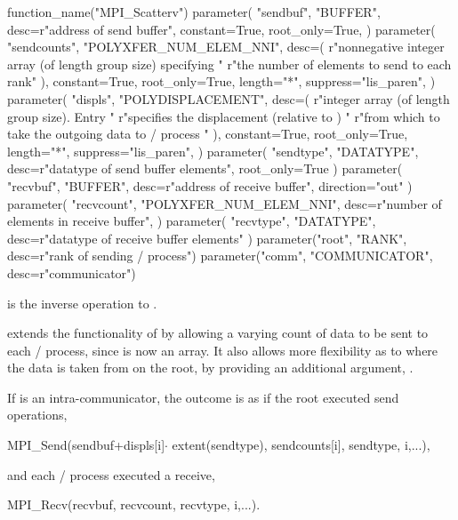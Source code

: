 \begin{mpi-binding}
    function_name("MPI_Scatterv")
    parameter(
        "sendbuf",
        "BUFFER",
        desc=r"address of send buffer",
        constant=True,
        root_only=True,
    )
    parameter(
        "sendcounts",
        "POLYXFER_NUM_ELEM_NNI",
        desc=(
            r"nonnegative integer array (of length group size) specifying "
            r"the number of elements to send to each rank"
        ),
        constant=True,
        root_only=True,
        length="*",
        suppress="lis_paren",
    )
    parameter(
        "displs",
        "POLYDISPLACEMENT",
        desc=(
            r"integer array (of length group size). Entry  "
            r"specifies the displacement (relative to ) "
            r"from which to take the outgoing data to \MPI/ process "
        ),
        constant=True,
        root_only=True,
        length="*",
        suppress="lis_paren",
    )
    parameter(
        "sendtype",
        "DATATYPE",
        desc=r"datatype of send buffer elements",
        root_only=True
    )
    parameter(
        "recvbuf", "BUFFER", desc=r"address of receive buffer", direction="out"
    )
    parameter(
        "recvcount",
        "POLYXFER_NUM_ELEM_NNI",
        desc=r"number of elements in receive buffer",
    )
    parameter(
        "recvtype", "DATATYPE", desc=r"datatype of receive buffer elements"
    )
    parameter("root", "RANK", desc=r"rank of sending \MPI/ process")
    parameter("comm", "COMMUNICATOR", desc=r"communicator")
\end{mpi-binding}

 is the inverse operation to .

 extends the functionality of 
by allowing a varying count of data to be sent to each \MPI/ process,
since  is now an array.
It also allows more flexibility as to where the data
is taken from on the root, by providing
an additional
argument, .

If  is an intra-communicator,
the outcome is as if the root executed  send operations,
\begin{mpicodeblock}
MPI\_Send(sendbuf+displs[i]$\cdot$ extent(sendtype), sendcounts[i],
sendtype, i,...),
\end{mpicodeblock}
\noindent and each \MPI/ process executed a receive,
\begin{mpicodeblock}
MPI\_Recv(recvbuf, recvcount, recvtype, i,...).
\end{mpicodeblock}


